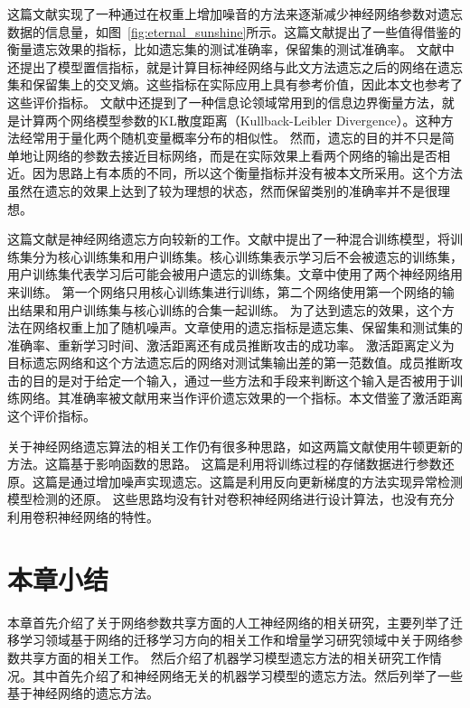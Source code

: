 这篇文献\cite{Golatkar_2020_CVPR}实现了一种通过在权重上增加噪音的方法来逐渐减少神经网络参数对遗忘数据的信息量，如图~\ref{fig:eternal_sunshine}所示。这篇文献提出了一些值得借鉴的衡量遗忘效果的指标，比如遗忘集的测试准确率，保留集的测试准确率。
文献中还提出了模型置信指标，就是计算目标神经网络与此文方法遗忘之后的网络在遗忘集和保留集上的交叉熵。这些指标在实际应用上具有参考价值，因此本文也参考了这些评价指标。
文献中还提到了一种信息论领域常用到的信息边界衡量方法，就是计算两个网络模型参数的KL散度距离（Kullback-Leibler Divergence）。这种方法经常用于量化两个随机变量概率分布的相似性。
然而，遗忘的目的并不只是简单地让网络的参数去接近目标网络，而是在实际效果上看两个网络的输出是否相近。因为思路上有本质的不同，所以这个衡量指标并没有被本文所采用。这个方法虽然在遗忘的效果上达到了较为理想的状态，然而保留类别的准确率并不是很理想。

这篇文献\cite{Golatkar_2021_CVPR}是神经网络遗忘方向较新的工作。文献中提出了一种混合训练模型，将训练集分为核心训练集和用户训练集。核心训练集表示学习后不会被遗忘的训练集，用户训练集代表学习后可能会被用户遗忘的训练集。文章中使用了两个神经网络用来训练。
第一个网络只用核心训练集进行训练，第二个网络使用第一个网络的输出结果和用户训练集与核心训练的合集一起训练。
为了达到遗忘的效果，这个方法在网络权重上加了随机噪声。文章使用的遗忘指标是遗忘集、保留集和测试集的准确率、重新学习时间、激活距离还有成员推断攻击的成功率。
激活距离定义为目标遗忘网络和这个方法遗忘后的网络对测试集输出差的第一范数值。成员推断攻击的目的是对于给定一个输入，通过一些方法和手段来判断这个输入是否被用于训练网络。其准确率被文献用来当作评价遗忘效果的一个指标。本文借鉴了激活距离这个评价指标。

关于神经网络遗忘算法的相关工作仍有很多种思路，如这两篇文献\cite{10.1007/978-3-030-58526-6_23,pmlr-v119-guo20c}使用牛顿更新的方法。这篇\cite{pmlr-v130-izzo21a}基于影响函数\cite{pmlr-v70-koh17a,cook_weisberg_1982}的思路。
这篇\cite{pmlr-v119-wu20b}是利用将训练过程的存储数据进行参数还原。这篇\cite{pmlr-v132-neel21a}是通过增加噪声实现遗忘。这篇\cite{10.1145/3319535.3363226}是利用反向更新梯度的方法实现异常检测模型检测的还原。
这些思路均没有针对卷积神经网络进行设计算法，也没有充分利用卷积神经网络的特性。

\section{本章小结}
本章首先介绍了关于网络参数共享方面的人工神经网络的相关研究，主要列举了迁移学习领域基于网络的迁移学习方向的相关工作和增量学习研究领域中关于网络参数共享方面的相关工作。
然后介绍了机器学习模型遗忘方法的相关研究工作情况。其中首先介绍了和神经网络无关的机器学习模型的遗忘方法。然后列举了一些基于神经网络的遗忘方法。